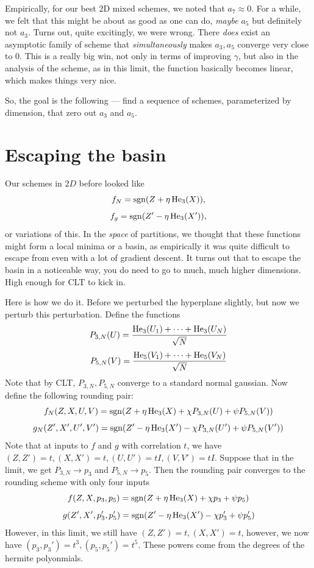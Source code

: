 \documentclass[12pt]{article}
\begin{document}
Empirically, for our best 2D mixed schemes, we noted that $a_7 \approx 0$. For a while, we felt that this might be about as good as one can do, \textit{maybe} $a_5$ but definitely not $a_3$. Turns out, quite excitingly, we were wrong. There \textit{does} exist an asymptotic family of scheme that \textit{simultaneously} makes $a_3, a_5$ converge very close to $0$. This is a really big win, not only in terms of improving $\gamma$, but also in the analysis of the scheme, as in this limit, the function basically becomes linear, which makes things very nice. 

So, the goal is the following --- find a sequence of schemes, parameterized by dimension, that zero out $a_3$ and $a_5$. 

\section{Escaping the basin}

Our schemes in $2D$ before looked like  
\[f_N = \operatorname{sgn}(Z + \eta\operatorname{He}_3(X)),\]
\[f_g = \operatorname{sgn}(Z' - \eta\operatorname{He}_3(X')),\]
or variations of this. In the \textit{space} of partitions, we thought that these functions might form a local minima or a basin, as empirically it was quite difficult to escape from even with a lot of gradient descent. It turns out that to escape the basin in a noticeable way, you do need to go to much, much higher dimensions. High enough for CLT to kick in.  

Here is how we do it. Before we perturbed the hyperplane slightly, but now we perturb this perturbation. Define the functions  
\[P_{3,N}(U) = \frac{\operatorname{He}_3(U_1) + \dots + \operatorname{He}_3(U_N)}{\sqrt{N}}\]
\[P_{5,N}(V) = \frac{\operatorname{He}_5(V_1) + \dots + \operatorname{He}_5(V_N)}{\sqrt{N}}\]
Note that by CLT, $P_{3,N}, P_{5,N}$ converge to a standard normal gaussian. Now define the following rounding pair: 
\[f_N(Z, X, U, V) = \operatorname{sgn}(Z + \eta \operatorname{He}_3(X) + \chi P_{3,N}(U) + \psi P_{5, N}(V))\]
\[g_N(Z', X', U', V') = \operatorname{sgn}(Z' - \eta \operatorname{He}_3(X') - \chi P_{3,N}(U') + \psi P_{5, N}(V'))\]
Note that at inputs to $f$ and $g$ with correlation $t$, we have $(Z, Z') = t, (X, X') = t, (U, U') = tI, (V, V') = tI$.
Suppose that in the limit, we get $P_{3,N} \to p_3$ and $P_{5,N} \to p_5$. Then the rounding pair converges to the rounding scheme with only four inputs
\[f(Z, X, p_3, p_5) = \operatorname{sgn}(Z + \eta \operatorname{He}_3(X) + \chi p_3 + \psi p_5)\]
\[g(Z', X', p_3', p_5') = \operatorname{sgn}(Z' - \eta \operatorname{He}_3(X') - \chi p_3' + \psi p_5')\]
However, in this limit, we still have $(Z, Z') = t, (X, X') = t$, however, we now have $(p_3, p_3') = t^3, (p_5, p_5') = t^5$. These powers come from the degrees of the hermite polyonmials. 
\end{document}
